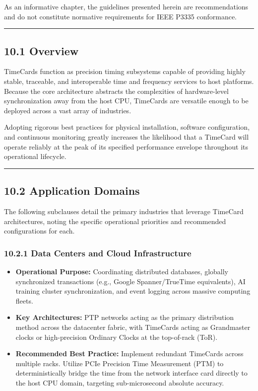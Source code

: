 As an informative chapter, the guidelines presented herein are
recommendations and do not constitute normative requirements for IEEE
P3335 conformance.

\begin{center}\rule{0.5\linewidth}{0.5pt}\end{center}

\subsection{10.1 Overview}\label{overview-4}

TimeCards function as precision timing subsystems capable of providing
highly stable, traceable, and interoperable time and frequency services
to host platforms. Because the core architecture abstracts the
complexities of hardware-level synchronization away from the host CPU,
TimeCards are versatile enough to be deployed across a vast array of
industries.

Adopting rigorous best practices for physical installation, software
configuration, and continuous monitoring greatly increases the
likelihood that a TimeCard will operate reliably at the peak of its
specified performance envelope throughout its operational lifecycle.

\begin{center}\rule{0.5\linewidth}{0.5pt}\end{center}

\subsection{10.2 Application Domains}\label{application-domains}

The following subclauses detail the primary industries that leverage
TimeCard architectures, noting the specific operational priorities and
recommended configurations for each.

\subsubsection{10.2.1 Data Centers and Cloud
Infrastructure}\label{data-centers-and-cloud-infrastructure}

\begin{itemize}
\tightlist
\item
  \textbf{Operational Purpose:} Coordinating distributed databases,
  globally synchronized transactions (e.g., Google Spanner/TrueTime
  equivalents), AI training cluster synchronization, and event logging
  across massive computing fleets.
\item
  \textbf{Key Architectures:} PTP networks acting as the primary
  distribution method across the datacenter fabric, with TimeCards
  acting as Grandmaster clocks or high-precision Ordinary Clocks at the
  top-of-rack (ToR).
\item
  \textbf{Recommended Best Practice:} Implement redundant TimeCards
  across multiple racks. Utilize PCIe Precision Time Measurement (PTM)
  to deterministically bridge the time from the network interface card
  directly to the host CPU domain, targeting sub-microsecond absolute
  accuracy.
\end{itemize}

